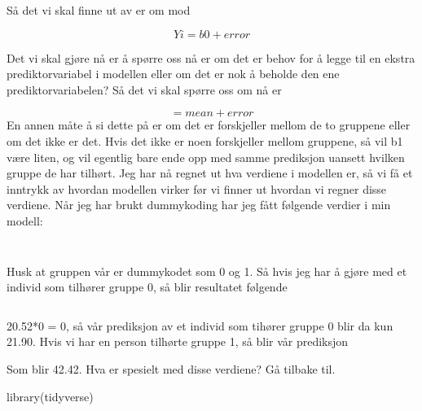 \documentclass[
]{book}
\newenvironment{Shaded}{\begin{snugshade}}{\end{snugshade}}
\newcommand{\FunctionTok}[1]{\textcolor[rgb]{0.00,0.00,0.00}{#1}}
\newcommand{\NormalTok}[1]{#1}
\begin{document}
Så det vi skal finne ut av er om mod

\[
Yi = b0 + error
\]

Det vi skal gjøre nå er å spørre oss nå er om det er behov for å legge til en ekstra prediktorvariabel i modellen eller om det er nok å beholde den ene prediktorvariabelen? Så det vi skal spørre oss om nå er

\[
 = mean + error
\]
En annen måte å si dette på er om det er forskjeller mellom de to gruppene eller om det ikke er det. Hvis det ikke er noen forskjeller mellom gruppene, så vil b1 være liten, og vil egentlig bare ende opp med samme prediksjon uansett hvilken gruppe de har tilhørt. Jeg har nå regnet ut hva verdiene i modellen er, så vi få et inntrykk av hvordan modellen virker før vi finner ut hvordan vi regner disse verdiene. Når jeg har brukt dummykoding har jeg fått følgende verdier i min modell:

\[
\]

\[
\]

Husk at gruppen vår er dummykodet som 0 og 1. Så hvis jeg har å gjøre med et individ som tilhører gruppe 0, så blir resultatet følgende

\[
\]

\[
\]
20.52*0 = 0, så vår prediksjon av et individ som tihører gruppe 0 blir da kun 21.90. Hvis vi har en person tilhørte gruppe 1, så blir vår prediksjon

\[
\]
Som blir 42.42. Hva er spesielt med disse verdiene? Gå tilbake til.

\begin{Shaded}
\begin{Highlighting}[]
\FunctionTok{library}\NormalTok{(tidyverse)}
\end{Highlighting}
\end{Shaded}
\end{document}
